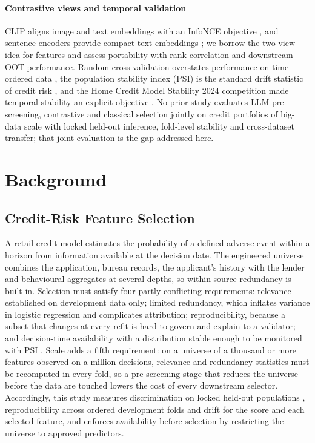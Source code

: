 \documentclass[final,5p,twocolumn]{elsarticle}
\begin{document}
\paragraph{Contrastive views and temporal validation}
CLIP aligns image and text embeddings with an InfoNCE objective \cite{radford2021,oord2018}, and sentence encoders provide compact text embeddings \cite{reimers2019,wang2020minilm}; we borrow the two-view idea for features and assess portability with rank correlation \cite{spearman1904} and downstream OOT performance. Random cross-validation overstates performance on time-ordered data \cite{bergmeir2012,gama2014}, the population stability index (PSI) is the standard drift statistic of credit risk \cite{yurdakul2020}, and the Home Credit Model Stability 2024 competition made temporal stability an explicit objective \cite{homecredit2024}. No prior study evaluates LLM pre-screening, contrastive and classical selection jointly on credit portfolios of big-data scale with locked held-out inference, fold-level stability and cross-dataset transfer; that joint evaluation is the gap addressed here.


\section{Background}
\label{sec:background}

\subsection{Credit-Risk Feature Selection}
\label{subsec:credit_risk_fs}

A retail credit model estimates the probability of a defined adverse event within a horizon from information available at the decision date. The engineered universe combines the application, bureau records, the applicant's history with the lender and behavioural aggregates at several depths, so within-source redundancy is built in. Selection must satisfy four partly conflicting requirements: relevance established on development data only; limited redundancy, which inflates variance in logistic regression and complicates attribution; reproducibility, because a subset that changes at every refit is hard to govern and explain to a validator; and decision-time availability with a distribution stable enough to be monitored with PSI \cite{siddiqi2006,thomas2002,yurdakul2020}. Scale adds a fifth requirement: on a universe of a thousand or more features observed on a million decisions, relevance and redundancy statistics must be recomputed in every fold, so a pre-screening stage that reduces the universe before the data are touched lowers the cost of every downstream selector. Accordingly, this study measures discrimination on locked held-out populations \cite{bergmeir2012}, reproducibility across ordered development folds and drift for the score and each selected feature, and enforces availability before selection by restricting the universe to approved predictors.
\end{document}
